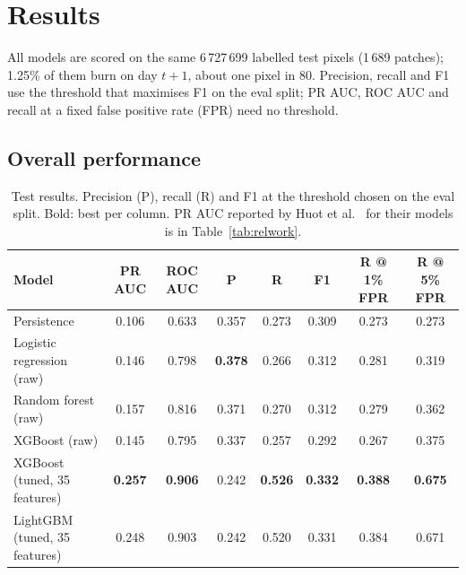 
\section{Results}
\label{sec:results}

All models are scored on the same 6\,727\,699 labelled test pixels (1\,689 patches); 1.25\% of them burn on
day $t+1$, about one pixel in 80. Precision, recall and F1 use the threshold that maximises F1 on the eval split;
PR AUC, ROC AUC and recall at a fixed false positive rate (FPR) need no threshold.

\subsection{Overall performance}

\begin{table}[t]
\centering
\caption{Test results. Precision (P), recall (R) and F1 at the threshold chosen on the eval split. Bold: best per
column. PR AUC reported by Huot et al.~\cite{huot2022} for their models is in Table~\ref{tab:relwork}.}
\label{tab:results}
\begin{tabular}{lccccccc}
\hline
Model & PR AUC & ROC AUC & P & R & F1 & R @ 1\% FPR & R @ 5\% FPR \\
\hline
Persistence & 0.106 & 0.633 & 0.357 & 0.273 & 0.309 & 0.273 & 0.273 \\
Logistic regression (raw) & 0.146 & 0.798 & \textbf{0.378} & 0.266 & 0.312 & 0.281 & 0.319 \\
Random forest (raw) & 0.157 & 0.816 & 0.371 & 0.270 & 0.312 & 0.279 & 0.362 \\
XGBoost (raw) & 0.145 & 0.795 & 0.337 & 0.257 & 0.292 & 0.267 & 0.375 \\
XGBoost (tuned, 35 features) & \textbf{0.257} & \textbf{0.906} & 0.242 & \textbf{0.526} & \textbf{0.332} & \textbf{0.388} & \textbf{0.675} \\
LightGBM (tuned, 35 features) & 0.248 & 0.903 & 0.242 & 0.520 & 0.331 & 0.384 & 0.671 \\
\hline
\end{tabular}
\end{table}

